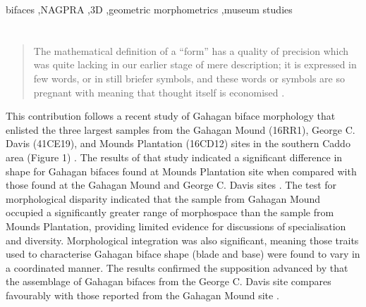 \documentclass[review]{elsarticle}
\begin{document}
\begin{frontmatter}
\begin{keyword}
bifaces \sep NAGPRA \sep 3D \sep geometric morphometrics \sep museum studies
\end{keyword}

\end{frontmatter}

\linenumbers

\section*{}

\begin{quote}
The mathematical definition of a ``form'' has a quality of precision which was quite lacking in our earlier stage of mere description; it is expressed in few words, or in still briefer symbols, and these words or symbols are so pregnant with meaning that thought itself is economised \citep[720-721]{RN11532}.    
\end{quote}

This contribution follows a recent study of Gahagan biface morphology that enlisted the three largest samples from the Gahagan Mound (16RR1), George C. Davis (41CE19), and Mounds Plantation (16CD12) sites in the southern Caddo area (Figure 1) \citep{RN11783}. The results of that study indicated a significant difference in shape for Gahagan bifaces found at Mounds Plantation site when compared with those found at the Gahagan Mound and George C. Davis sites \citep[Figure 7]{RN11783}. The test for morphological disparity indicated that the sample from Gahagan Mound occupied a significantly greater range of morphospace than the sample from Mounds Plantation, providing limited evidence for discussions of specialisation and diversity. Morphological integration was also significant, meaning those traits used to characterise Gahagan biface shape (blade and base) were found to vary in a coordinated manner. The results confirmed the supposition advanced by \cite{RN3684} that the assemblage of Gahagan bifaces from the George C. Davis site compares favourably with those reported from the Gahagan Mound site \citep{RN5274,RN2740}.
\end{document}
